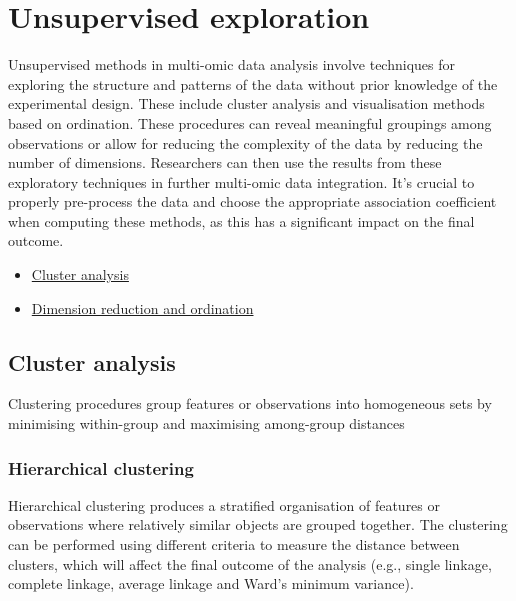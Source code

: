 \documentclass[
]{book}
\providecommand{\tightlist}{%
  \setlength{\itemsep}{0pt}\setlength{\parskip}{0pt}}
\begin{document}
\normalsize

\hypertarget{unsupervised-exploration}{%
\chapter{Unsupervised exploration}\label{unsupervised-exploration}}

Unsupervised methods in multi-omic data analysis involve techniques for exploring the structure and patterns of the data without prior knowledge of the experimental design. These include cluster analysis and visualisation methods based on ordination. These procedures can reveal meaningful groupings among observations or allow for reducing the complexity of the data by reducing the number of dimensions. Researchers can then use the results from these exploratory techniques in further multi-omic data integration. It's crucial to properly pre-process the data and choose the appropriate association coefficient when computing these methods, as this has a significant impact on the final outcome.

\begin{itemize}
\tightlist
\item
  \protect\hyperlink{cluster-analysis}{Cluster analysis}
\item
  \protect\hyperlink{dimension-reduction-ordination}{Dimension reduction and ordination}
\end{itemize}

\hypertarget{cluster-analysis}{%
\section{Cluster analysis}\label{cluster-analysis}}

Clustering procedures group features or observations into homogeneous sets by minimising within-group and maximising among-group distances

\hypertarget{hierarchical-clustering}{%
\subsection{Hierarchical clustering}\label{hierarchical-clustering}}

Hierarchical clustering produces a stratified organisation of features or observations where relatively similar objects are grouped together. The clustering can be performed using different criteria to measure the distance between clusters, which will affect the final outcome of the analysis (e.g., single linkage, complete linkage, average linkage and Ward's minimum variance).
\end{document}
